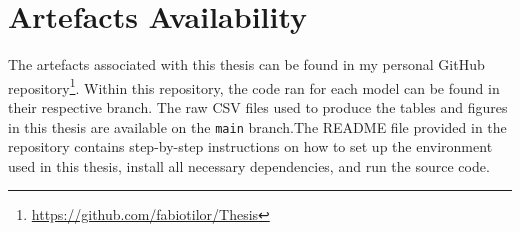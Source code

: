 \chapter{Artefacts Availability}
\label{a:appendix}

The artefacts associated with this thesis can be found in my personal GitHub repository\footnote{\url{https://github.com/fabiotilor/Thesis}}. Within this repository, the code ran for each model can be found in their respective branch. The raw CSV files used to produce the tables and figures in this thesis are available on the \texttt{main} branch.The README file provided in the repository contains step-by-step instructions on how to set up the environment used in this thesis, install all necessary dependencies, and run the source code.

